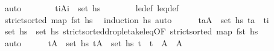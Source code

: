 \begin{isabellebody}
\ auto\isanewline
\ \ \ \ \isamarkupfalse%
\ \isamarkupfalse%
\ {\isachardoublequoteopen}{\isacharparenleft}{\kern0pt}t\isactrlsub i{\isacharcomma}{\kern0pt}A\isactrlsub i{\isacharparenright}{\kern0pt}\ {\isasymin}\ set\ {\isacharquery}{\kern0pt}hs{\isacharprime}{\kern0pt}{\isachardoublequoteclose}\isanewline
\ \ \ \ \ \ \isamarkupfalse%
\ le{\isacharunderscore}{\kern0pt}def\ leq{\isacharunderscore}{\kern0pt}def\isanewline
\ \ \ \ \ \ \isamarkupfalse%
\ {\isacartoucheopen}strict{\isacharunderscore}{\kern0pt}sorted\ {\isacharparenleft}{\kern0pt}map\ fst\ hs{\isacharparenright}{\kern0pt}{\isacartoucheclose}\ \isamarkupfalse%
\ {\isacharparenleft}{\kern0pt}induction\ hs{\isacharparenright}{\kern0pt}\ auto\isanewline
\ \ \ \ \isamarkupfalse%
\ {\isachardoublequoteopen}{\isasymforall}{\isacharparenleft}{\kern0pt}t\isactrlsub a{\isacharcomma}{\kern0pt}A{\isacharparenright}{\kern0pt}\ {\isasymin}\ set\ {\isacharquery}{\kern0pt}hs{\isacharprime}{\kern0pt}{\isachardot}{\kern0pt}\ t\isactrlsub a\ {\isacharequal}{\kern0pt}\ t\isactrlsub i{\isachardoublequoteclose}\isanewline
\ \ \ \ \ \ \isamarkupfalse%
\ {\isacartoucheopen}set\ {\isacharquery}{\kern0pt}hs{\isacharprime}{\kern0pt}\ {\isasymsubseteq}\ set\ hs{\isacartoucheclose}\ strict{\isacharunderscore}{\kern0pt}sorted{\isacharunderscore}{\kern0pt}drop{\isacharunderscore}{\kern0pt}le{\isacharunderscore}{\kern0pt}take{\isacharunderscore}{\kern0pt}leq{\isacharbrackleft}{\kern0pt}OF\ {\isacartoucheopen}strict{\isacharunderscore}{\kern0pt}sorted\ {\isacharparenleft}{\kern0pt}map\ fst\ hs{\isacharparenright}{\kern0pt}{\isacartoucheclose}{\isacharbrackright}{\kern0pt}\isanewline
\ \ \ \ \ \ \isamarkupfalse%
\ auto\isanewline
\ \ \ \ \isamarkupfalse%
\ {\isachardoublequoteopen}{\isasymforall}{\isacharparenleft}{\kern0pt}tA\ {\isasymin}\ set\ hs{\isachardot}{\kern0pt}\ {\isasymforall}{\isacharparenleft}{\kern0pt}tA\ {\isasymin}\ set\ hs{\isachardot}{\kern0pt}\ t\ {\isacharequal}{\kern0pt}\ t\ {\isasymlongrightarrow}\ A\ {\isacharequal}{\kern0pt}\ A\isanewline
\ \ \ \ \ \ \isamarkupfalse%

\end{isabellebody}
